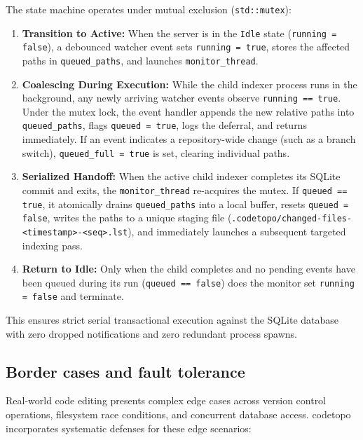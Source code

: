 The state machine operates under mutual exclusion (\texttt{std::mutex}):
\begin{enumerate}
  \item \textbf{Transition to Active:} When the server is in the \texttt{Idle} state (\texttt{running = false}),
        a debounced watcher event sets \texttt{running = true}, stores the affected paths in
        \texttt{queued\_paths}, and launches \texttt{monitor\_thread}.
  \item \textbf{Coalescing During Execution:} While the child indexer process runs in the background, any newly
        arriving watcher events observe \texttt{running == true}. Under the mutex lock, the event handler
        appends the new relative paths into \texttt{queued\_paths}, flags \texttt{queued = true}, logs the
        deferral, and returns immediately. If an event indicates a repository-wide change (such as a branch switch),
        \texttt{queued\_full = true} is set, clearing individual paths.
  \item \textbf{Serialized Handoff:} When the active child indexer completes its SQLite commit and exits, the
        \texttt{monitor\_thread} re-acquires the mutex. If \texttt{queued == true}, it atomically drains
        \texttt{queued\_paths} into a local buffer, resets \texttt{queued = false}, writes the paths to a unique
        staging file (\texttt{.codetopo/\allowbreak changed-files-\allowbreak\textless timestamp\textgreater-\allowbreak\textless seq\textgreater.lst}),
        and immediately launches a subsequent targeted indexing pass.
  \item \textbf{Return to Idle:} Only when the child completes and no pending events have been queued during its run
        (\texttt{queued == false}) does the monitor set \texttt{running = false} and terminate.
\end{enumerate}
This ensures strict serial transactional execution against the SQLite database with zero dropped notifications and
zero redundant process spawns.

\subsection{Border cases and fault tolerance}
\label{sec:border-cases}

Real-world code editing presents complex edge cases across version control operations, filesystem race conditions,
and concurrent database access. codetopo incorporates systematic defenses for these edge scenarios:

